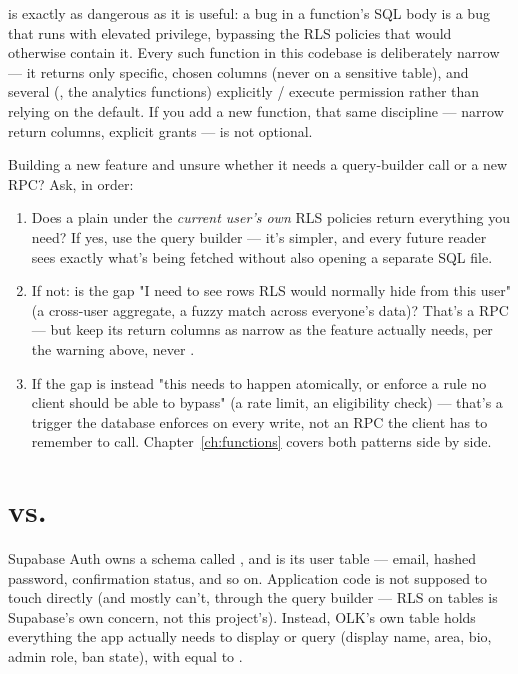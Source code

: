 \begin{olkwarn}
 is exactly as dangerous as it is useful: a bug in a  function's SQL body is a bug that runs with elevated privilege, bypassing the RLS policies that would otherwise contain it. Every such function in this codebase is deliberately narrow — it returns only specific, chosen columns (never  on a sensitive table), and several (, the  analytics functions) explicitly / execute permission rather than relying on the default. If you add a new  function, that same discipline — narrow return columns, explicit grants — is not optional.
\end{olkwarn}

\begin{olkhowto}
Building a new feature and unsure whether it needs a query-builder call or a new RPC? Ask, in order:
\begin{enumerate}
  \item Does a plain  under the \emph{current user's own} RLS policies return everything you need? If yes, use the query builder — it's simpler, and every future reader sees exactly what's being fetched without also opening a separate SQL file.
  \item If not: is the gap "I need to see rows RLS would normally hide from this user" (a cross-user aggregate, a fuzzy match across everyone's data)? That's a  RPC — but keep its return columns as narrow as the feature actually needs, per the warning above, never .
  \item If the gap is instead "this needs to happen atomically, or enforce a rule no client should be able to bypass" (a rate limit, an eligibility check) — that's a trigger the database enforces on every write, not an RPC the client has to remember to call. Chapter~\ref{ch:functions} covers both patterns side by side.
\end{enumerate}
\end{olkhowto}

\section{ vs. }

Supabase Auth owns a schema called , and  is its user table — email, hashed password, confirmation status, and so on. Application code is not supposed to touch  directly (and mostly can't, through the query builder — RLS on  tables is Supabase's own concern, not this project's). Instead, OLK's own  table holds everything the app actually needs to display or query (display name, area, bio, admin role, ban state), with  equal to .

